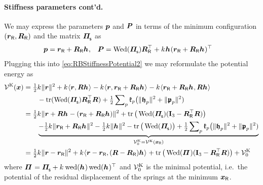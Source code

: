 \paragraph{Stiffness parameters cont'd.}
We may express the parameters $\boldsymbol{p}$ and $\boldsymbol{P}$ in terms of the minimum configuration $(\boldsymbol{r}_{\mathsf{R}}, \boldsymbol{R}_{\mathsf{R}})$ and the matrix $\bodyMOSs{}{}$ as
\begin{align}
 \tuple{p} &= \rR + \RR \bodyCOS{}{},&
 \mat{P} &= \wedMatOp(\bodyMOSs{}{}) \RR^\top + \bodyStiffness{}{}\bodyCOS{}{}(\rR + \RR \bodyCOS{}{})^\top
\end{align}
Plugging this into \eqref{eq:RBStiffnessPotential2} we may reformulate the potential energy as
\begin{align}\label{eq:RBStiffnessPotential3}
 \potentialStiff(\sysCoord) &= \tfrac{1}{2} \bodyStiffness{}{}\norm{\r}^2 + \bodyStiffness{}{} \sProd{\r}{\R \bodyCOS{}{}} - \bodyStiffness{}{} \sProd{\r}{\rR + \RR \bodyCOS{}{}} - \bodyStiffness{}{}\sProd{\rR + \RR \bodyCOS{}{}}{\R\bodyCOS{}{}}
\nonumber\\
 &\qquad -\tr(\wedMatOp(\bodyMOSs{}{}) \RR^\top \R) + \tfrac{1}{2} \sumParticles \particleStiffness{\PidxI} \big( \norm{\particleBodyPos{\PidxI}}^2 + \norm{\springHubPos{\PidxI}}^2)
\nonumber\\
 &= \tfrac{1}{2} \bodyStiffness{}{}\norm{\r+\R\bodyCOS{}{} - (\rR+\RR\bodyCOS{}{})}^2 + \tr\big(\wedMatOp(\bodyMOSs{}{}) (\idMat[3] - \RR^\top \R)\big)
\nonumber\\
 &\qquad \underbrace{-\tfrac{1}{2} \bodyStiffness{}{}\norm{\rR+\RR\bodyCOS{}{}}^2 - \tfrac{1}{2} \bodyStiffness{}{}\norm{\bodyCOS{}{}}^2 - \tr\big(\wedMatOp(\bodyMOSs{}{})\big)+ \tfrac{1}{2} \sumParticles \particleStiffness{\PidxI} \big( \norm{\particleBodyPos{\PidxI}}^2 + \norm{\springHubPos{\PidxI}}^2)}_{\potentialStiff_0=\potentialStiff(\sysCoordR)}
\nonumber\\
 &= \tfrac{1}{2} \bodyStiffness{}{} \norm{\r - \rR}^2 
 + \bodyStiffness{}{} \sProd{\r-\rR}{(\R-\RR)\bodyCOS{}{}}
 + \tr\big(\wedMatOp(\bodyMOS{}{}) (\idMat[3] - \RR^\top \R)\big)
 + \potentialStiff_0
\end{align}
where $\bodyMOS{}{} = \bodyMOSs{}{} + \bodyStiffness{}{} \wedOp(\bodyCOS{}{}) \wedOp(\bodyCOS{}{})^\top$ and  $\mathcal{V}^{\mathrm{K}}_0$ is the minimal potential, i.e.\ the potential of the residual displacement of the springs at the minimum $\boldsymbol{x}_{\mathsf{R}}$.
